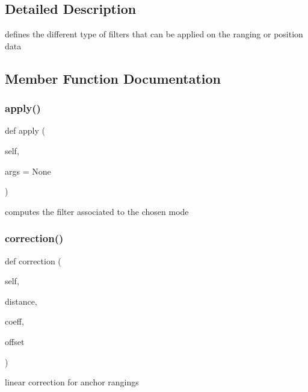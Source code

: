 \subsection{Detailed Description}
\begin{DoxyVerb}defines the different type of filters that can be applied on the ranging or position data\end{DoxyVerb}
 

\subsection{Member Function Documentation}
\mbox{\label{class_filter_1_1_filter_a9849d232d39b301ea2c8b2489e7bae25}} 
\subsubsection{\texorpdfstring{apply()}{apply()}}
{\footnotesize\ttfamily def apply (\begin{DoxyParamCaption}\item[{}]{self,  }\item[{}]{args = {\ttfamily None} }\end{DoxyParamCaption})}

\begin{DoxyVerb}computes the filter associated to the chosen mode\end{DoxyVerb}
 \mbox{\label{class_filter_1_1_filter_a48a07f17663fd614b10c091f30ec782d}} 
\subsubsection{\texorpdfstring{correction()}{correction()}}
{\footnotesize\ttfamily def correction (\begin{DoxyParamCaption}\item[{}]{self,  }\item[{}]{distance,  }\item[{}]{coeff,  }\item[{}]{offset }\end{DoxyParamCaption})}

\begin{DoxyVerb}linear correction for anchor rangings\end{DoxyVerb}
 \mbox{\label{class_filter_1_1_filter_a2c58efe0f4ad2e2b24ca15cfcac279de}} 
